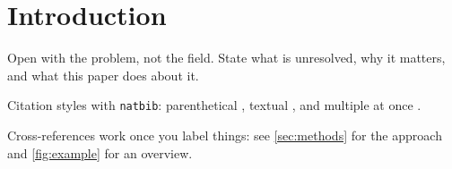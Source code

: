 \section{Introduction}
\label{sec:intro}

Open with the problem, not the field. State what is unresolved, why it
matters, and what this paper does about it.

Citation styles with \texttt{natbib}: parenthetical \citep{knuth1984texbook},
textual \citet{lamport1994latex}, and multiple at once
\citep{knuth1984texbook,lamport1994latex}.

Cross-references work once you label things: see \autoref{sec:methods}
for the approach and \autoref{fig:example} for an overview.
